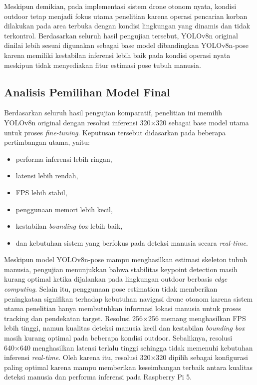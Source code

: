 Meskipun demikian, pada implementasi sistem drone otonom nyata, kondisi outdoor tetap menjadi fokus utama penelitian karena operasi pencarian korban dilakukan pada area terbuka dengan kondisi lingkungan yang dinamis dan tidak terkontrol. Berdasarkan seluruh hasil pengujian tersebut, YOLOv8n original dinilai lebih sesuai digunakan sebagai base model dibandingkan YOLOv8n-pose karena memiliki kestabilan inferensi lebih baik pada kondisi operasi nyata meskipun tidak menyediakan fitur estimasi pose tubuh manusia.

\subsection{Analisis Pemilihan Model Final}

Berdasarkan seluruh hasil pengujian komparatif, penelitian ini memilih YOLOv8n original dengan resolusi inferensi 320×320 sebagai base model utama untuk proses \textit{fine-tuning}.
Keputusan tersebut didasarkan pada beberapa pertimbangan utama, yaitu:

\begin{itemize}
	\item performa inferensi lebih ringan,
	\item latensi lebih rendah,
	\item FPS lebih stabil,
	\item penggunaan memori lebih kecil,
	\item kestabilan \textit{bounding box} lebih baik,
	\item dan kebutuhan sistem yang berfokus pada deteksi manusia secara \textit{real-time}.
\end{itemize}

Meskipun model YOLOv8n-pose mampu menghasilkan estimasi skeleton tubuh manusia, pengujian menunjukkan bahwa stabilitas keypoint detection masih kurang optimal ketika dijalankan pada lingkungan outdoor berbasis \textit{edge computing}.
Selain itu, penggunaan pose estimation tidak memberikan peningkatan signifikan terhadap kebutuhan navigasi drone otonom karena sistem utama penelitian hanya membutuhkan informasi lokasi manusia untuk proses tracking dan pendekatan target.
Resolusi 256×256 memang menghasilkan FPS lebih tinggi, namun kualitas deteksi manusia kecil dan kestabilan \textit{bounding box} masih kurang optimal pada beberapa kondisi outdoor.
Sebaliknya, resolusi 640×640 menghasilkan latensi terlalu tinggi sehingga tidak memenuhi kebutuhan inferensi \textit{real-time}.
Oleh karena itu, resolusi 320×320 dipilih sebagai konfigurasi paling optimal karena mampu memberikan keseimbangan terbaik antara kualitas deteksi manusia dan performa inferensi pada Raspberry Pi 5.

